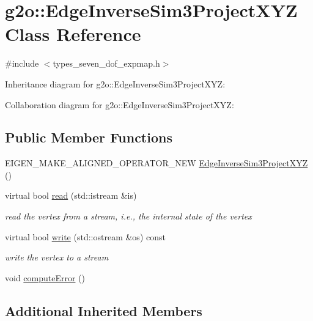 \hypertarget{classg2o_1_1EdgeInverseSim3ProjectXYZ}{}\section{g2o\+:\+:Edge\+Inverse\+Sim3\+Project\+X\+YZ Class Reference}
\label{classg2o_1_1EdgeInverseSim3ProjectXYZ}


{\ttfamily \#include $<$types\+\_\+seven\+\_\+dof\+\_\+expmap.\+h$>$}



Inheritance diagram for g2o\+:\+:Edge\+Inverse\+Sim3\+Project\+X\+YZ\+:


Collaboration diagram for g2o\+:\+:Edge\+Inverse\+Sim3\+Project\+X\+YZ\+:
\subsection*{Public Member Functions}
\begin{DoxyCompactItemize}
\item 
E\+I\+G\+E\+N\+\_\+\+M\+A\+K\+E\+\_\+\+A\+L\+I\+G\+N\+E\+D\+\_\+\+O\+P\+E\+R\+A\+T\+O\+R\+\_\+\+N\+EW \hyperlink{classg2o_1_1EdgeInverseSim3ProjectXYZ_af4e344ee9f610b41eea60b5914a776bd}{Edge\+Inverse\+Sim3\+Project\+X\+YZ} ()
\item 
virtual bool \hyperlink{classg2o_1_1EdgeInverseSim3ProjectXYZ_ac229f31599a4f08eebe8f9b239d883f6}{read} (std\+::istream \&is)
\begin{DoxyCompactList}\small\item\em read the vertex from a stream, i.\+e., the internal state of the vertex \end{DoxyCompactList}\item 
virtual bool \hyperlink{classg2o_1_1EdgeInverseSim3ProjectXYZ_a9df647cceceabdecd26692647211e043}{write} (std\+::ostream \&os) const 
\begin{DoxyCompactList}\small\item\em write the vertex to a stream \end{DoxyCompactList}\item 
void \hyperlink{classg2o_1_1EdgeInverseSim3ProjectXYZ_a8fa376524e861ae8c4f1a360d217f02d}{compute\+Error} ()
\end{DoxyCompactItemize}
\subsection*{Additional Inherited Members}


